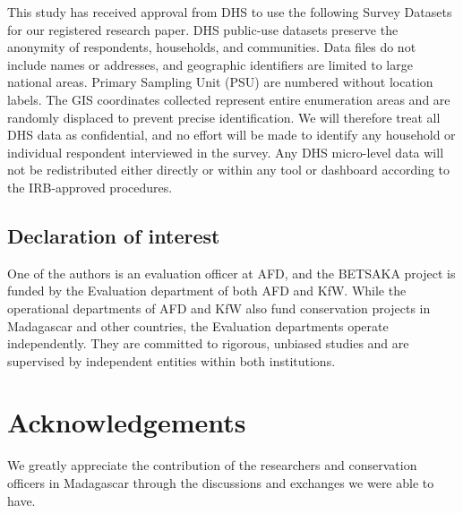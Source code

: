 \documentclass[
]{article}
\begin{document}
This study has received approval from DHS to use the following Survey
Datasets for our registered research paper. DHS public-use datasets
preserve the anonymity of respondents, households, and communities. Data
files do not include names or addresses, and geographic identifiers are
limited to large national areas. Primary Sampling Unit (PSU) are
numbered without location labels. The GIS coordinates collected
represent entire enumeration areas and are randomly displaced to prevent
precise identification. We will therefore treat all DHS data as
confidential, and no effort will be made to identify any household or
individual respondent interviewed in the survey. Any DHS micro-level
data will not be redistributed either directly or within any tool or
dashboard according to the IRB-approved procedures.

\subsection{Declaration of interest}\label{declaration-of-interest}

One of the authors is an evaluation officer at AFD, and the BETSAKA
project is funded by the Evaluation department of both AFD and KfW.
While the operational departments of AFD and KfW also fund conservation
projects in Madagascar and other countries, the Evaluation departments
operate independently. They are committed to rigorous, unbiased studies
and are supervised by independent entities within both institutions.

\section{Acknowledgements}\label{acknowledgements}

We greatly appreciate the contribution of the researchers and
conservation officers in Madagascar through the discussions and
exchanges we were able to have.
\end{document}
